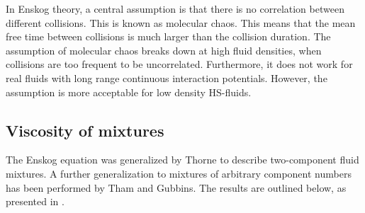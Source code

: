 In Enskog theory, a central assumption is that there is no correlation between different collisions. 
This is known as molecular chaos.
This means that the mean free time between collisions is much larger than the collision duration. 
The assumption of molecular chaos breaks down at high fluid densities, when collisions are too frequent to be uncorrelated.
Furthermore, it does not work for real fluids with long range continuous interaction potentials.
However, the assumption is more acceptable for low density HS-fluids. 


\subsection{Viscosity of mixtures}
The Enskog equation was generalized by Thorne to describe 
two-component fluid mixtures\cite{ref:chapman:non_uniform_gases}.
A further generalization to mixtures of arbitrary component numbers 
has been performed by Tham and Gubbins\cite{ref:tham:fluid_mixtures}.
The results are outlined below, 
as presented in \cite{ref:pippo:composition_dependence}.

